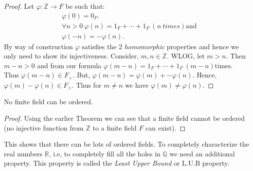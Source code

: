 \begin{proof}
     
    Let $\varphi : \mathbb{Z} \rightarrow F$ be such that:
\begin{displaymath}
    \begin{aligned}
	&\varphi(0) = 0_F. \\
	&\forall n > 0 \ \varphi(n) = 1_F + \cdots + 1_F \ (n \ times) \text{and} \\
	&\varphi(-n) = -\varphi(n).
    \end{aligned}
\end{displaymath}
By way of construction $\varphi$ 
satisfies the 2 \textit{homomorphic} properties and hence we only need to show 
its injectiveness. Consider, $m,n \in \mathbb{Z}$. WLOG, let $m > n$. Then $m-n > 0$ and from our 
formula $\varphi(m-n) = 1_F + \cdots + 1_F \ (m-n) \text{times} $. Thus $\varphi(m-n) \in F_{+}$. 
But, $\varphi(m-n) = \varphi(m) + -\varphi(n)$. Hence, $\varphi(m) - \varphi(n) \in F_{+}$. Thus for
$m \neq n$ we have $\varphi(m) \neq \varphi(n)$. 
\end{proof}

\begin{Theorem}[name=Finite fields cannot be ordered]
    No finite field can be ordered.
\end{Theorem}
\begin{proof}
    Using the earlier Theorem we can see that a finite field cannot be ordered (no injective function
    from $\mathbb{Z}$ to a finite field $F$ can exist).  
\end{proof}

This shows that there can be lots of ordered fields. To completely characterize the real numbers $\mathbb{R}$,
i.e, to completely fill all the holes in $\mathbb{Q}$ we need an additional property. This property is
called the \textit{Least Upper Bound} or L.U.B property. 

